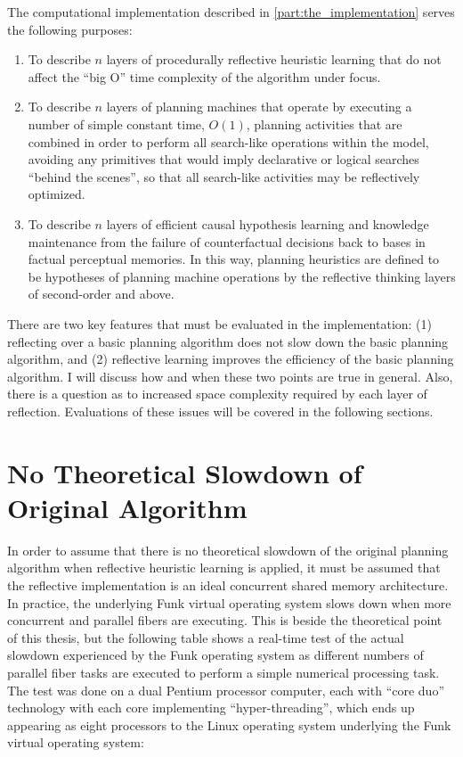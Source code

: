 The computational implementation described in
{\mbox{\autoref{part:the_implementation}}} serves the following
purposes:
\begin{enumerate}
\item To describe $n$ layers of procedurally reflective heuristic
  learning that do not affect the ``big O'' time complexity of the
  algorithm under focus.
\item To describe $n$ layers of planning machines that operate by
  executing a number of simple constant time, $O(1)$, planning
  activities that are combined in order to perform all search-like
  operations within the model, avoiding any primitives that would
  imply declarative or logical searches ``behind the scenes'', so that
  all search-like activities may be reflectively optimized.
\item To describe $n$ layers of efficient causal hypothesis learning
  and knowledge maintenance from the failure of counterfactual
  decisions back to bases in factual perceptual memories.  In this
  way, planning heuristics are defined to be hypotheses of planning
  machine operations by the reflective thinking layers of second-order
  and above.
\end{enumerate}
There are two key features that must be evaluated in the
implementation: (1) reflecting over a basic planning algorithm does
not slow down the basic planning algorithm, and (2) reflective
learning improves the efficiency of the basic planning algorithm.  I
will discuss how and when these two points are true in general.  Also,
there is a question as to increased space complexity required by each
layer of reflection.  Evaluations of these issues will be covered in
the following sections.

\section{No Theoretical Slowdown of Original Algorithm}

In order to assume that there is no theoretical slowdown of the
original planning algorithm when reflective heuristic learning is
applied, it must be assumed that the reflective implementation is an
ideal concurrent shared memory architecture.  In practice, the
underlying Funk virtual operating system slows down when more
concurrent and parallel fibers are executing.  This is beside the
theoretical point of this thesis, but the following table shows a
real-time test of the actual slowdown experienced by the Funk
operating system as different numbers of parallel fiber tasks are
executed to perform a simple numerical processing task.  The test was
done on a dual Pentium processor computer, each with ``core duo''
technology with each core implementing ``hyper-threading'', which ends
up appearing as eight processors to the Linux operating system
underlying the Funk virtual operating system:


